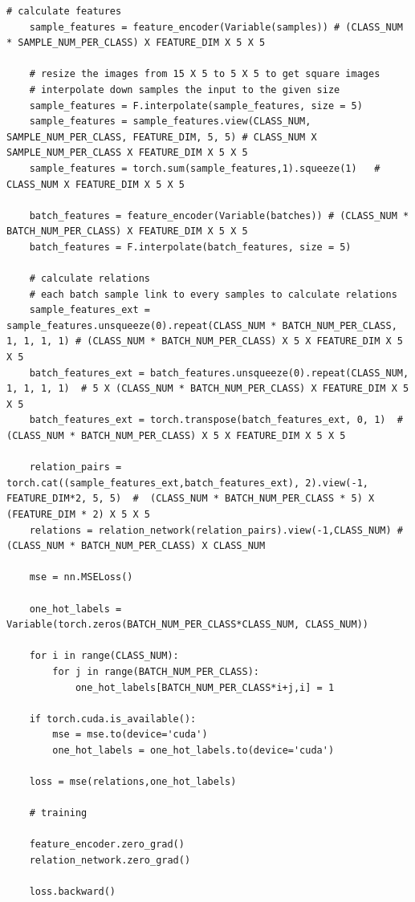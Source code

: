 \documentclass[12pt,a4paper,titlepage]{article}
\begin{document}
\begin{lstlisting}[language=iPython,firstnumber=1, caption=relation\_training.py, label=relation training,captionpos=b]
    # calculate features
    sample_features = feature_encoder(Variable(samples)) # (CLASS_NUM * SAMPLE_NUM_PER_CLASS) X FEATURE_DIM X 5 X 5

    # resize the images from 15 X 5 to 5 X 5 to get square images
    # interpolate down samples the input to the given size
    sample_features = F.interpolate(sample_features, size = 5)
    sample_features = sample_features.view(CLASS_NUM, SAMPLE_NUM_PER_CLASS, FEATURE_DIM, 5, 5) # CLASS_NUM X SAMPLE_NUM_PER_CLASS X FEATURE_DIM X 5 X 5
    sample_features = torch.sum(sample_features,1).squeeze(1)   # CLASS_NUM X FEATURE_DIM X 5 X 5

    batch_features = feature_encoder(Variable(batches)) # (CLASS_NUM * BATCH_NUM_PER_CLASS) X FEATURE_DIM X 5 X 5
    batch_features = F.interpolate(batch_features, size = 5)

    # calculate relations
    # each batch sample link to every samples to calculate relations
    sample_features_ext = sample_features.unsqueeze(0).repeat(CLASS_NUM * BATCH_NUM_PER_CLASS, 1, 1, 1, 1) # (CLASS_NUM * BATCH_NUM_PER_CLASS) X 5 X FEATURE_DIM X 5 X 5
    batch_features_ext = batch_features.unsqueeze(0).repeat(CLASS_NUM, 1, 1, 1, 1)  # 5 X (CLASS_NUM * BATCH_NUM_PER_CLASS) X FEATURE_DIM X 5 X 5
    batch_features_ext = torch.transpose(batch_features_ext, 0, 1)  #  (CLASS_NUM * BATCH_NUM_PER_CLASS) X 5 X FEATURE_DIM X 5 X 5

    relation_pairs = torch.cat((sample_features_ext,batch_features_ext), 2).view(-1, FEATURE_DIM*2, 5, 5)  #  (CLASS_NUM * BATCH_NUM_PER_CLASS * 5) X (FEATURE_DIM * 2) X 5 X 5
    relations = relation_network(relation_pairs).view(-1,CLASS_NUM) #  (CLASS_NUM * BATCH_NUM_PER_CLASS) X CLASS_NUM

    mse = nn.MSELoss()
    
    one_hot_labels = Variable(torch.zeros(BATCH_NUM_PER_CLASS*CLASS_NUM, CLASS_NUM))

    for i in range(CLASS_NUM):
        for j in range(BATCH_NUM_PER_CLASS):
            one_hot_labels[BATCH_NUM_PER_CLASS*i+j,i] = 1

    if torch.cuda.is_available():
        mse = mse.to(device='cuda')
        one_hot_labels = one_hot_labels.to(device='cuda')

    loss = mse(relations,one_hot_labels)

    # training

    feature_encoder.zero_grad()
    relation_network.zero_grad()

    loss.backward()


\end{lstlisting}
\end{document}
